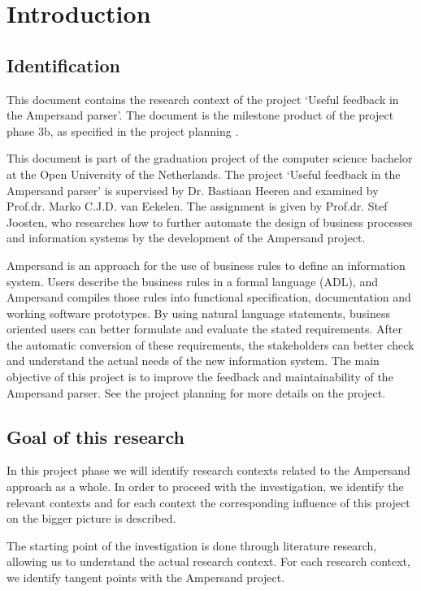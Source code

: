 
\section{Introduction}
\subsection{Identification}
This document contains the research context of the project `Useful feedback in the Ampersand parser'.
The document is the milestone product of the project phase 3b, as specified in the project planning .

This document is part of the graduation project of the computer science bachelor at the Open University of the Netherlands.
The project `Useful feedback in the Ampersand parser' is supervised by Dr. Bastiaan Heeren and examined by Prof.dr. Marko C.J.D. van Eekelen.
The assignment is given by Prof.dr. Stef Joosten, who researches how to further automate the design of business processes and information systems by the development of the Ampersand project.

Ampersand is an approach for the use of business rules to define an information system.
Users describe the business rules in a formal language (ADL), and Ampersand compiles those rules into functional specification, documentation and working software prototypes. 
By using natural language statements, business oriented users can better formulate and evaluate the stated requirements.
After the automatic conversion of these requirements, the stakeholders can better check and understand the actual needs of the new information system.
The main objective of this project is to improve the feedback and maintainability of the Ampersand parser.
See the project planning  for more details on the project.

\subsection{Goal of this research}
In this project phase we will identify research contexts related to the Ampersand approach as a whole.
In order to proceed with the investigation, we identify the relevant contexts and for each context the corresponding influence of this project on the bigger picture is described.

The starting point of the investigation is done through literature research, allowing us to understand the actual research context.
For each research context, we identify tangent points with the Ampersand project.

